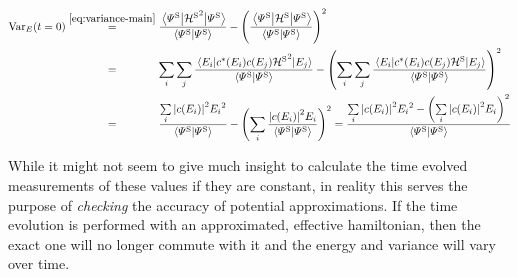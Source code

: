 \begin{equation}
    \label{eq:variance-constant}
    \begin{split}
        \varianceOft[t=0] &\stackrel{\ref{eq:variance-main}}{=} \frac{\bracketHelper{\picturePsi[\schroedingerPicture]{}}{{\pictureHamiltonian[\schroedingerPicture]}^2}{\picturePsi[\schroedingerPicture]{}}}{\braketHelper{\picturePsi[\schroedingerPicture]{}}{\picturePsi[\schroedingerPicture]{}}}-\left(\frac{\bracketHelper{\picturePsi[\schroedingerPicture]{}}{\pictureHamiltonian[\schroedingerPicture]}{\picturePsi[\schroedingerPicture]{}}}{\braketHelper{\picturePsi[\schroedingerPicture]{}}{\picturePsi[\schroedingerPicture]{}}}\right)^2
        \\ &\stackrel{\phantom{\ref{eq:variance-main}}}{=} 
        \lsum[i]
        \lsum[j]
        \frac{\bracketHelper{E_i}{c^\ast(E_i)c(E_j){\pictureHamiltonian[\schroedingerPicture]}^2}{E_j}}{\braketHelper{\picturePsi[\schroedingerPicture]{}}{\picturePsi[\schroedingerPicture]{}}}
        -\left(
            \lsum[i]
            \lsum[j]
            \frac{\bracketHelper{E_i}{c^\ast(E_i)c(E_j)\pictureHamiltonian[\schroedingerPicture]}{E_j}}{\braketHelper{\picturePsi[\schroedingerPicture]{}}{\picturePsi[\schroedingerPicture]{}}}
        \right)^2
        \\ &\stackrel{\phantom{\ref{eq:variance-main}}}{=} 
        \frac{
            \lsum[i]
            \absSquare{c(E_i)}{E_i}^2}{\braketHelper{\picturePsi[\schroedingerPicture]{}}{\picturePsi[\schroedingerPicture]{}}}
        -\left(
            \lsum[i]
            \frac{\absSquare{c(E_i)}E_i}{\braketHelper{\picturePsi[\schroedingerPicture]{}}{\picturePsi[\schroedingerPicture]{}}}
        \right)^2
        =
        \frac{
            \lsum[i]
            \absSquare{c(E_i)}{E_i}^2 
            -\left(
                \lsum[i]
                \absSquare{c(E_i)}E_i
            \right)^2
        }{\braketHelper{\picturePsi[\schroedingerPicture]{}}{\picturePsi[\schroedingerPicture]{}}}
    \end{split}
\end{equation}

While it might not seem to give much insight to calculate the time evolved measurements of these values if they are constant, in reality this serves the purpose of \emph{checking} the accuracy of potential approximations.
If the time evolution is performed with an approximated, effective hamiltonian, then the exact one will no longer commute with it and the energy and variance will vary over time.

